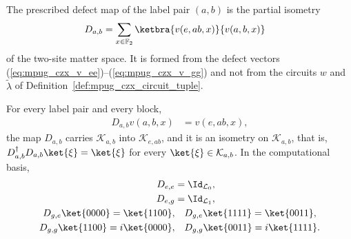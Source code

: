 \begin{definition}
    \label{def:mpug_czx_prescribed_maps}
    \leanok
    The prescribed defect map of the label pair $(a,b)$ is the partial
    isometry
    \begin{align}
        D_{a,b} & =\sum_{x\in\mathbb F_2}\ketbra{v(e,ab,x)}{v(a,b,x)}
        \label{eq:mpug_czx_prescribed_map}
    \end{align}
    of the two-site matter space. It is formed from the defect vectors
    (\ref{eq:mpug_czx_v_ee})--(\ref{eq:mpug_czx_v_gg}) and not from the
    circuits $w$ and $\tilde\lambda$ of
    Definition~\ref{def:mpug_czx_circuit_tuple}.
\end{definition}

\begin{lemma}
    \label{thm:mpug_czx_prescribed_action}
    \leanok
    For every label pair and every block,
    \begin{align}
        D_{a,b}v(a,b,x) & =v(e,ab,x),
        \label{eq:mpug_czx_prescription}
    \end{align}
    the map $D_{a,b}$ carries $\mathcal K_{a,b}$ into $\mathcal K_{e,ab}$, and
    it is an isometry on $\mathcal K_{a,b}$, that is,
    $D_{a,b}^{\dagger}D_{a,b}\ket{\xi}=\ket{\xi}$ for every
    $\ket{\xi}\in\mathcal K_{a,b}$. In the computational basis,
    \begin{align}
        D_{e,e} & =\Id_{\mathcal L_0},
        \label{eq:mpug_czx_map_ee}                     \\
        D_{e,g} & =\Id_{\mathcal L_1},
        \label{eq:mpug_czx_map_eg}                     \\
        D_{g,e}\ket{0000}=\ket{1100},
                & \quad D_{g,e}\ket{1111}=\ket{0011},
        \label{eq:mpug_czx_map_ge}                     \\
        D_{g,g}\ket{1100}=i\ket{0000},
                & \quad D_{g,g}\ket{0011}=i\ket{1111}.
        \label{eq:mpug_czx_map_gg}
    \end{align}
\end{lemma}

